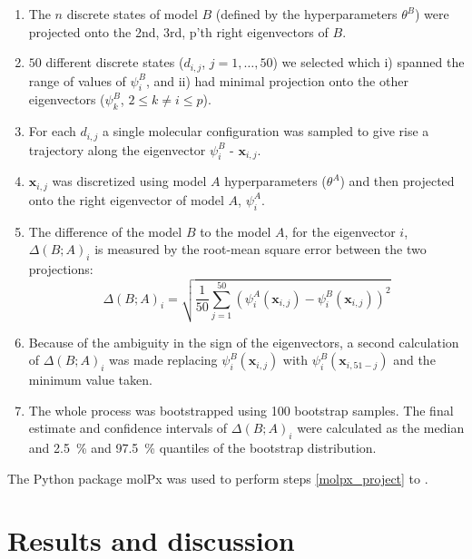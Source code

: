 \documentclass[journal=jacsat,manuscript=article]{achemso}
\begin{document}
\begin{enumerate}
    \item The $n$ discrete states of model $B$  (defined by the hyperparameters $\theta^{B}$) were projected onto the 2nd, 3rd, p'th right eigenvectors of $B$.  \label{molpx_project}
    \item $50$ different discrete states ($d_{i,j}$, $j = 1,\ldots, 50$) we selected which i) spanned the range of values of $\psi^{B}_{i}$, and ii) had minimal projection onto the other eigenvectors ($\psi^{B}_{k}$, $2 \le k \ne i \le p$). \label{molpx_sample}
    \item For each $d_{i,j}$ a single molecular configuration was sampled to give rise a trajectory along the eigenvector $\psi^{B}_{i}$ - $\mathbf{x}_{i, j}$.  \label{molpx_configs}
    \item $\mathbf{x}_{i, j}$ was discretized using model $A$ hyperparameters ($\theta^{A}$) and then projected onto the right eigenvector of model $A$, $\psi^{A}_{i}$. 
    \item The difference of the model $B$ to the model $A$, for the eigenvector $i$, $\Delta(B; A)_{i}$ is measured by the root-mean square error between the two projections:
    \begin{equation}
        \Delta(B; A)_{i} = \sqrt{\frac{1}{50}\sum_{j=1}^{50} \left(\psi^{A}_{i}(\mathbf{x}_{i, j})- \psi^{B}_{i}(\mathbf{x}_{i, j})\right )^{2}}
    \end{equation}\label{eqn:overlap}
    \item Because of the ambiguity in the sign of the eigenvectors, a second calculation of  $\Delta(B; A)_{i}$ was made replacing $\psi^{B}_{i}(\mathbf{x}_{i, j})$ with $\psi^{B}_{i}(\mathbf{x}_{i, 51-j})$ and the minimum value taken.  
    \item The whole process was bootstrapped using \num{100} bootstrap samples. The final estimate and confidence intervals of $\Delta(B; A)_{i}$ were calculated as the median and \SI{2.5}{\percent} and \SI{97.5}{\percent} quantiles of the bootstrap distribution.  
\end{enumerate}

The Python package molPx was used to perform steps \ref{molpx_project} to \label{molpx_configs}. 



\section{Results and discussion}
\end{document}

